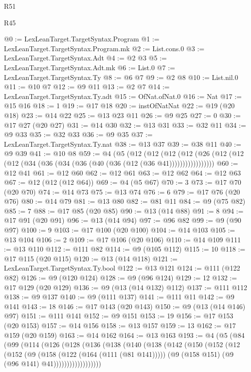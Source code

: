 \begin{lexlean}{R51}
\begin{lexlean}{R45}
\begin{coremodule}
{{{{{{{{{{{{{{{{{{{{{{{{{{{{{{{{{{{{{{{{{{{{{{{{{{{{{{{{{{{{{{{{{{{{{{{{{{{{{{{{{{{{{{{{{{{@0 := LexLeanTarget.TargetSyntax.Program
@1 := LexLeanTarget.TargetSyntax.Program.mk
@2 := List.cons.{0}
@3 := LexLeanTarget.TargetSyntax.Adt
@4 := @2 @3
@5 := LexLeanTarget.TargetSyntax.Adt.mk
@6 := List.{0}
@7 := LexLeanTarget.TargetSyntax.Ty
@8 := @6 @7
@9 := @2 @8
@10 := List.nil.{0}
@11 := @10 @7
@12 := @9 @11
@13 := @2 @7
@14 := LexLeanTarget.TargetSyntax.Ty.adt
@15 := OfNat.ofNat.{0}
@16 := Nat
@17 := @15 @16
@18 := 1
@19 := @17 @18
@20 := instOfNatNat
@22 := @19 (@20 @18)
@23 := @14 @22
@25 := @13 @23 @11
@26 := @9 @25
@27 := 0
@30 := @17 @27 (@20 @27)
@31 := @14 @30
@32 := @13 @31
@33 := @32 @11
@34 := @9 @33
@35 := @32 @33
@36 := @9 @35
@37 := LexLeanTarget.TargetSyntax.Ty.nat
@38 := @13 @37
@39 := @38 @11
@40 := @9 @39
@41 := @10 @8
@59 := @4
    (@5
      (@12
        (@12
          (@12 (@12 (@26 (@12 (@12 (@12 (@34 (@36 (@34 (@36 (@40 (@36 (@12 (@36 @41)))))))))))))))))
@60 := @12 @41
@61 := @12 @60
@62 := @12 @61
@63 := @12 @62
@64 := @12 @63
@67 := @12 (@12 (@12 @64))
@69 := @4 (@5 @67)
@70 := 3
@73 := @17 @70 (@20 @70)
@74 := @14 @73
@75 := @13 @74
@76 := 6
@79 := @17 @76 (@20 @76)
@80 := @14 @79
@81 := @13 @80
@82 := @81 @11
@84 := @9 (@75 @82)
@85 := 7
@88 := @17 @85 (@20 @85)
@90 := @13 (@14 @88)
@91 := 8
@94 := @17 @91 (@20 @91)
@96 := @13 (@14 @94)
@97 := @96 @82
@99 := @9 (@90 @97)
@100 := 9
@103 := @17 @100 (@20 @100)
@104 := @14 @103
@105 := @13 @104
@106 := 2
@109 := @17 @106 (@20 @106)
@110 := @14 @109
@111 := @13 @110
@112 := @111 @82
@114 := @9 (@105 @112)
@115 := 10
@118 := @17 @115 (@20 @115)
@120 := @13 (@14 @118)
@121 := LexLeanTarget.TargetSyntax.Ty.bool
@122 := @13 @121
@124 := @111 (@122 @82)
@126 := @9 (@120 @124)
@128 := @9 (@96 @124)
@129 := 12
@132 := @17 @129 (@20 @129)
@136 := @9 (@13 (@14 @132) @112)
@137 := @111 @112
@138 := @9 @137
@140 := @9 (@111 @137)
@141 := @111 @11
@142 := @9 @141
@143 := 18
@146 := @17 @143 (@20 @143)
@150 := @9 (@13 (@14 @146) @97)
@151 := @111 @141
@152 := @9 @151
@153 := 19
@156 := @17 @153 (@20 @153)
@157 := @14 @156
@158 := @13 @157
@159 := 13
@162 := @17 @159 (@20 @159)
@163 := @14 @162
@164 := @13 @163
@193 := @4
    (@5
      (@84
        (@99
          (@114
            (@126
              (@128
                (@136
                  (@138
                    (@140
                      (@138
                        (@142
                          (@150
                            (@152
                              (@12
                                (@152
                                  (@9
                                    (@158 (@122 (@164 (@111 (@81 @141)))))
                                    (@9 (@158 @151) (@9 (@96 @141) @41))))))))))))))))))
}}}}}}}}}}}}}}}}}}}}}}}}}}}}}}}}}}}}}}}}}}}}}}}}}}}}}}}}}}}}}}}}}}}}}}}}}}}}}}}}}}}}}}}}}}}
\end{coremodule}
\end{lexlean}
\end{lexlean}
